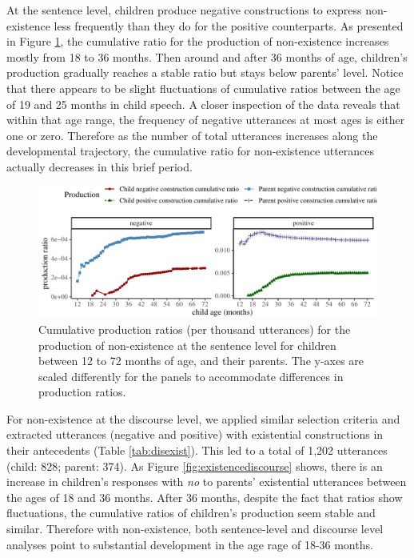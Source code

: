 \documentclass[
  man,floatsintext]{apa6}
\begin{document}
At the sentence level, children produce negative constructions to express non-existence less frequently than they do for the positive counterparts. As presented in Figure \ref{fig:existence}, the cumulative ratio for the production of non-existence increases mostly from 18 to 36 months. Then around and after 36 months of age, children's production gradually reaches a stable ratio but stays below parents' level. Notice that there appears to be slight fluctuations of cumulative ratios between the age of 19 and 25 months in child speech. A closer inspection of the data reveals that within that age range, the frequency of negative utterances at most ages is either one or zero. Therefore as the number of total utterances increases along the developmental trajectory, the cumulative ratio for non-existence utterances actually decreases in this brief period.

\begin{figure}[H]

{\centering \includegraphics{neg_construction_article_files/figure-latex/existence-1} 

}

\caption{Cumulative production ratios (per thousand utterances) for the production of non-existence at the sentence level for children between 12 to 72 months of age, and their parents. The y-axes are scaled differently for the panels to accommodate differences in production ratios.}\label{fig:existence}
\end{figure}

For non-existence at the discourse level, we applied similar selection criteria and extracted utterances (negative and positive) with existential constructions in their antecedents (Table \ref{tab:disexist}). This led to a total of 1,202 utterances (child: 828; parent: 374). As Figure \ref{fig:existencediscourse} shows, there is an increase in children's responses with \emph{no} to parents' existential utterances between the ages of 18 and 36 months. After 36 months, despite the fact that ratios show fluctuations, the cumulative ratios of children's production seem stable and similar. Therefore with non-existence, both sentence-level and discourse level analyses point to substantial development in the age rage of 18-36 months.
\end{document}
